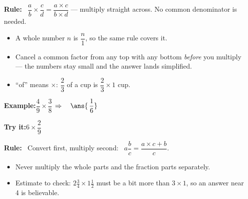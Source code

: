 \documentclass[12pt]{article}
\begin{document}


\begin{formulabox}
\textbf{Rule:} \ $\dfrac{a}{b} \times \dfrac{c}{d} = \dfrac{a \times c}{b \times d}$
--- multiply straight across. No common denominator is needed.
\begin{itemize}[leftmargin=0.8cm, itemsep=1pt, topsep=2pt]
  \item A whole number $n$ is $\dfrac{n}{1}$, so the same rule covers it.
  \item Cancel a common factor from any top with any bottom \emph{before} you
        multiply --- the numbers stay small and the answer lands simplified.
  \item ``of'' means $\times$: $\dfrac{2}{3}$ of a cup is $\dfrac{2}{3} \times 1$ cup.
\end{itemize}
\end{formulabox}

\begin{examplebox}
\textbf{Example:}\quad $\dfrac{4}{9} \times \dfrac{3}{8}$
$\Rightarrow\quad \ans{\,\dfrac{1}{6}}$
\end{examplebox}

\begin{tryitbox}
\textbf{Try it:}\quad $6 \times \dfrac{2}{9}$\\[2pt]
\end{tryitbox}


\begin{formulabox}
\textbf{Rule:} \ Convert first, multiply second:
\ $a\dfrac{b}{c} = \dfrac{a \times c + b}{c}$.
\begin{itemize}[leftmargin=0.8cm, itemsep=1pt, topsep=2pt]
  \item Never multiply the whole parts and the fraction parts separately.
  \item Estimate to check: $2\frac{3}{4} \times 1\frac{1}{2}$ must be a bit more
        than $3 \times 1$, so an answer near 4 is believable.
\end{itemize}
\end{formulabox}
\end{document}
